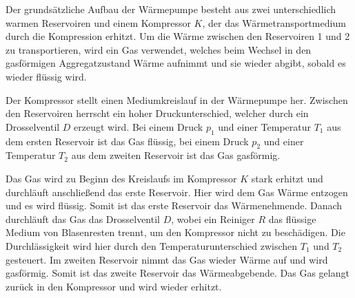 
    Der grundsätzliche Aufbau der Wärmepumpe besteht aus zwei unterschiedlich warmen Reservoiren und einem Kompressor $K$,
    der das Wärmetransportmedium durch die Kompression erhitzt.
    Um die Wärme zwischen den Reservoiren 1 und 2 zu transportieren,
    wird ein Gas verwendet,
    welches beim Wechsel in den gasförmigen
    Aggregatzustand Wärme aufnimmt und sie wieder abgibt,
    sobald es wieder flüssig wird.

    Der Kompressor stellt einen Mediumkreislauf in der Wärmepumpe her.
    Zwischen den Reservoiren herrscht ein hoher Druckunterschied,
    welcher durch ein Drosselventil $D$ erzeugt wird.
    Bei einem Druck $p_1$ und einer Temperatur $T_1$ aus dem ersten Reservoir ist das Gas flüssig,
    bei einem Druck $p_2$ und einer Temperatur $T_2$ aus dem zweiten Reservoir ist das Gas gasförmig.

    Das Gas wird zu Beginn des Kreislaufs im Kompressor $K$ stark erhitzt und durchläuft anschließend das erste Reservoir.
    Hier wird dem Gas Wärme entzogen und es wird flüssig.
    Somit ist das erste Reservoir das Wärmenehmende.
    Danach durchläuft das Gas das Drosselventil $D$,
    wobei ein Reiniger $R$ das flüssige Medium von Blasenresten trennt,
    um den Kompressor nicht zu beschädigen.
    Die Durchlässigkeit wird hier durch den Temperaturunterschied zwischen $T_1$ und $T_2$ gesteuert.
    Im zweiten Reservoir nimmt das Gas wieder Wärme auf und wird gasförmig.
    Somit ist das zweite Reservoir das Wärmeabgebende.
    Das Gas gelangt zurück in den Kompressor und wird wieder erhitzt.
